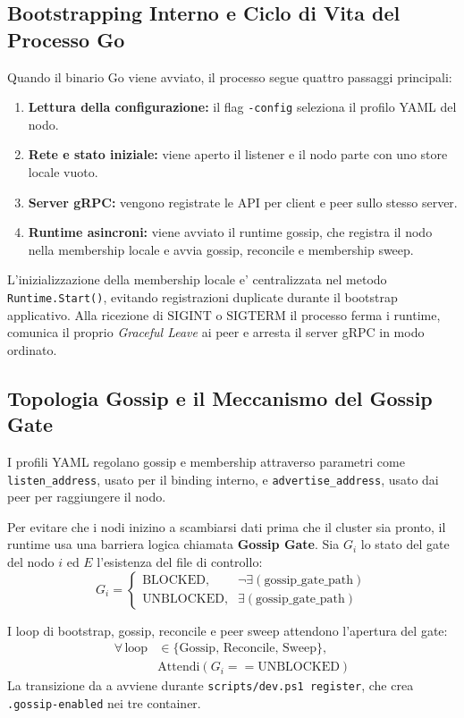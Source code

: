 \documentclass[conference]{IEEEtran}
\begin{document}
\subsection{Bootstrapping Interno e Ciclo di Vita del Processo Go}
Quando il binario Go viene avviato, il processo segue quattro passaggi principali:
\begin{enumerate}
    \item \textbf{Lettura della configurazione:} il flag \texttt{-config} seleziona il profilo YAML del nodo.
    \item \textbf{Rete e stato iniziale:} viene aperto il listener e il nodo parte con uno store locale vuoto.
    \item \textbf{Server gRPC:} vengono registrate le API per client e peer sullo stesso server.
    \item \textbf{Runtime asincroni:} viene avviato il runtime gossip, che registra il nodo nella membership locale e avvia gossip, reconcile e membership sweep.
\end{enumerate}
  L'inizializzazione della membership locale e' centralizzata nel metodo \texttt{Runtime.Start()}, evitando registrazioni duplicate durante il bootstrap applicativo.
Alla ricezione di $\text{SIGINT}$ o $\text{SIGTERM}$ il processo ferma i runtime, comunica il proprio \textit{Graceful Leave} ai peer e arresta il server gRPC in modo ordinato.

\subsection{Topologia Gossip e il Meccanismo del Gossip Gate}
I profili YAML regolano gossip e membership attraverso parametri come \texttt{listen\_address}, usato per il binding interno, e \texttt{advertise\_address}, usato dai peer per raggiungere il nodo.

Per evitare che i nodi inizino a scambiarsi dati prima che il cluster sia pronto, il runtime usa una barriera logica chiamata \textbf{Gossip Gate}. Sia $G_i$ lo stato del gate del nodo $i$ ed $E$ l'esistenza del file di controllo:
\begin{equation}
G_i = \begin{cases} \text{BLOCKED}, & \neg\exists(\text{gossip\_gate\_path}) \\ \text{UNBLOCKED}, & \exists(\text{gossip\_gate\_path}) \end{cases}
\end{equation}

I loop di bootstrap, gossip, reconcile e peer sweep attendono l'apertura del gate:
\begin{equation}
\begin{aligned}
\forall\,\text{loop} &\in \{\text{Gossip, Reconcile, Sweep}\},\\
&\text{Attendi}(G_i == \text{UNBLOCKED})
\end{aligned}
\end{equation}
La transizione da  a  avviene durante \texttt{scripts/dev.ps1 register}, che crea \texttt{.gossip-enabled} nei tre container.
\end{document}
